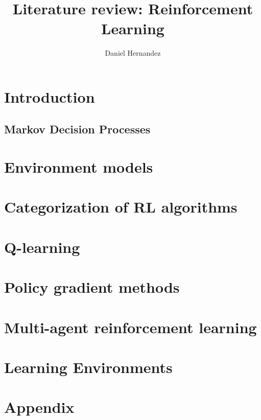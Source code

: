 \documentclass{article}
\title{\textbf{Literature review: Reinforcement Learning}}
\author{Daniel Hernandez}
\date{ }
\begin{document}
\maketitle

\tableofcontents

\newpage

% 
% 
\section{Introduction}


    \subsection{Markov Decision Processes}\label{section:markov-decision-processes}
    

    
\section{Environment models}\label{section:environment-models}

    
\section{Categorization of RL algorithms}\label{section:categorization}


\section{Q-learning}\label{section:q-learning}

 
\section{Policy gradient methods}\label{section:policy-gradient-methods}

  
\section{Multi-agent reinforcement learning}


\section{Learning Environments}


\section{Appendix}




\end{document}

